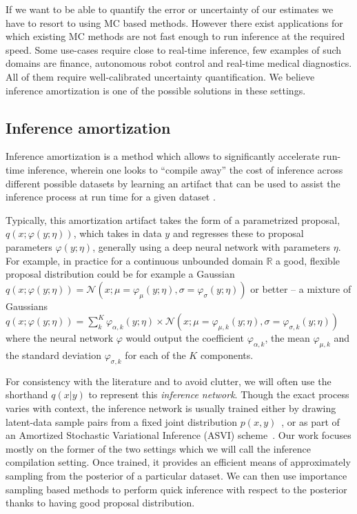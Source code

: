 \documentclass[12pt]{article}
\begin{document}
If we want to be able to quantify the error or uncertainty of our estimates we have to resort to using MC based methods.
However there exist applications for which existing MC methods are not fast enough to run inference at the required speed.
Some use-cases require close to real-time inference, few examples of such domains are finance, autonomous robot control and real-time medical diagnostics. 
All of them require well-calibrated uncertainty quantification.
We believe inference amortization is one of the possible solutions in these settings.




\subsection{Inference amortization}

Inference amortization is a method which allows to significantly accelerate run-time inference, wherein one looks to ``compile away'' the cost of inference
across different possible datasets
by learning an artifact that can be used to assist the inference process
at run time for a given dataset
\citep{StuhlmullerEtAl2013, VAE, ritchie2016deep, PaigeWood2016, LeEtAl2016, LeEtAl2017, FIVO, NaessethEtAl2017}.

Typically, this amortization
artifact takes the form of a parametrized proposal, $q(x ; \varphi(y; \eta))$, which takes
in data $y$ and regresses these to proposal parameters $\varphi(y; \eta)$, generally using
a deep neural network with parameters $\eta$.
For example, in practice for a continuous unbounded domain $\mathbb{R}$ 
a good, flexible proposal distribution could be for example a Gaussian 
$q(x ; \varphi(y; \eta)) = \mathcal{N}(x;\mu=\varphi_{\mu}(y; \eta),\sigma=\varphi_{\sigma}(y; \eta))$
or better -- a mixture of Gaussians
$q(x ; \varphi(y; \eta)) = \sum_k^K \varphi_{\alpha,k}(y; \eta) \times \mathcal{N}(x;\mu=\varphi_{\mu,k}(y; \eta),\sigma=\varphi_{\sigma,k}(y; \eta))$
where the neural network $\varphi$ would output 
the coefficient $\varphi_{\alpha,k}$,
the mean $\varphi_{\mu,k}$ and
the standard deviation $\varphi_{\sigma,k}$
for each of the $K$ components.

For consistency with the literature and to avoid clutter, we will often
use the shorthand $q(x|y)$ to represent this \emph{inference network}.
Though the exact process varies with context,
the inference network is usually trained either by drawing latent-data
sample pairs from a fixed joint distribution
$p(x,y)$~\citep{ritchie2016deep,PaigeWood2016,LeEtAl2016}, or 
as part of an Amortized Stochastic Variational Inference (ASVI) scheme~\citep{HoffmanEtAl2013,VAE,RezendeEtAl2014}.
Our work focuses mostly on the former of the two settings which we will call the inference compilation setting.
Once trained, it provides an efficient means of approximately
sampling from the posterior of a particular dataset.
We can then use importance sampling based methods to perform quick inference 
with respect to the posterior thanks to having good proposal distribution.
\end{document}
